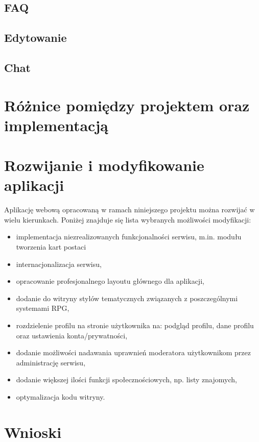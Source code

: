 \subsection{FAQ}
\label{sec:faq}

\subsection{Edytowanie}
\label{sec:edit}

\subsection{Chat}
\label{sec:chat}



\section{Różnice pomiędzy projektem oraz implementacją}
\label{sec:roznice}



\section{Rozwijanie i modyfikowanie aplikacji}
\label{sec:rozwoj}

Aplikację webową opracowaną w ramach niniejszego projektu można rozwijać w wielu kierunkach. Poniżej znajduje się lista wybranych możliwości modyfikacji:
\begin{itemize}
\item implementacja niezrealizowanych funkcjonalności serwisu, m.in. modułu tworzenia kart postaci
\item internacjonalizacja serwisu,
\item opracowanie profesjonalnego layoutu głównego dla aplikacji,
\item dodanie do witryny stylów tematycznych związanych z poszczególnymi systemami RPG,
\item rozdzielenie profilu na stronie użytkownika na: podgląd profilu, dane profilu oraz ustawienia konta/prywatności,
\item dodanie możliwości nadawania uprawnień moderatora użytkownikom przez administrację serwisu,
\item dodanie większej ilości funkcji społecznościowych, np. listy znajomych,
\item optymalizacja kodu witryny.
\end{itemize}


\section{Wnioski}
\label{sec:doswiadczenia}

